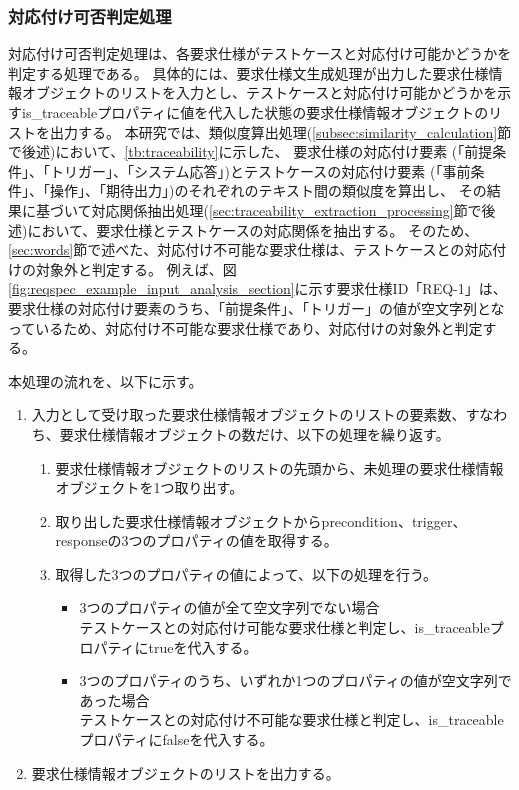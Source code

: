 \subsubsection{対応付け可否判定処理}\label{subsubsec:req_traceability}
対応付け可否判定処理は、各要求仕様がテストケースと対応付け可能かどうかを判定する処理である。
具体的には、要求仕様文生成処理が出力した要求仕様情報オブジェクトのリストを入力とし、テストケースと対応付け可能かどうかを示すis\_traceableプロパティに値を代入した状態の要求仕様情報オブジェクトのリストを出力する。
本研究では、類似度算出処理(\ref{subsec:similarity_calculation}節で後述)において、\cref{tb:traceability}に示した、
要求仕様の対応付け要素 (「前提条件」、「トリガー」、「システム応答」)とテストケースの対応付け要素 (「事前条件」、「操作」、「期待出力」)のそれぞれのテキスト間の類似度を算出し、
その結果に基づいて対応関係抽出処理(\ref{sec:traceability_extraction_processing}節で後述)において、要求仕様とテストケースの対応関係を抽出する。
そのため、\ref{sec:words}節で述べた、対応付け不可能な要求仕様は、テストケースとの対応付けの対象外と判定する。
例えば、図\ref{fig:reqspec_example_input_analysis_section}に示す要求仕様ID「REQ-1」は、要求仕様の対応付け要素のうち、「前提条件」、「トリガー」の値が空文字列となっているため、対応付け不可能な要求仕様であり、対応付けの対象外と判定する。

本処理の流れを、以下に示す。
\begin{enumerate}
    \item 入力として受け取った要求仕様情報オブジェクトのリストの要素数、すなわち、要求仕様情報オブジェクトの数だけ、以下の処理を繰り返す。
    \begin{enumerate}
        \item 要求仕様情報オブジェクトのリストの先頭から、未処理の要求仕様情報オブジェクトを1つ取り出す。
        \item 取り出した要求仕様情報オブジェクトからprecondition、trigger、responseの3つのプロパティの値を取得する。
        \item 取得した3つのプロパティの値によって、以下の処理を行う。
        \begin{itemize}
            \item 3つのプロパティの値が全て空文字列でない場合\\
            テストケースとの対応付け可能な要求仕様と判定し、is\_traceableプロパティにtrueを代入する。
        \end{itemize}
        \begin{itemize}
            \item 3つのプロパティのうち、いずれか1つのプロパティの値が空文字列であった場合\\
            テストケースとの対応付け不可能な要求仕様と判定し、is\_traceableプロパティにfalseを代入する。
        \end{itemize}
    \end{enumerate}
    \item 要求仕様情報オブジェクトのリストを出力する。
\end{enumerate}

